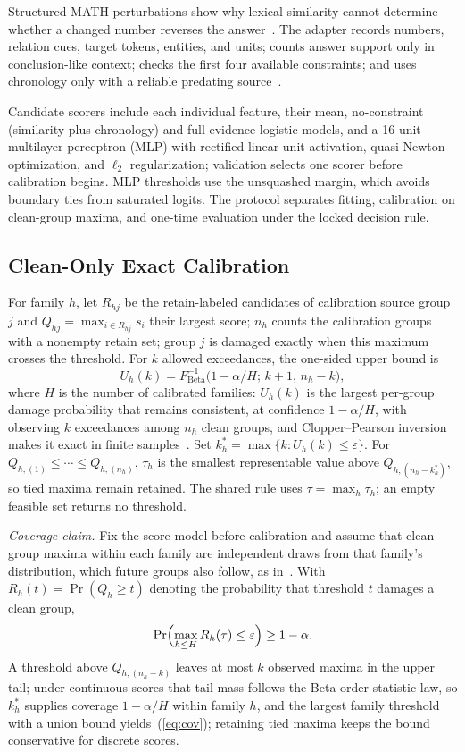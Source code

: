 \documentclass[conference]{IEEEtran}
\begin{document}
Structured MATH perturbations show why lexical similarity cannot determine whether a changed number reverses the answer~\cite{huang2025}. The adapter records numbers, relation cues, target tokens, entities, and units; counts answer support only in conclusion-like context; checks the first four available constraints; and uses chronology only with a reliable predating source~\cite{miao2020}.

Candidate scorers include each individual feature, their mean, no-constraint (similarity-plus-chronology) and full-evidence logistic models, and a 16-unit multilayer perceptron (MLP) with rectified-linear-unit activation, quasi-Newton optimization, and $\ell_2$ regularization; validation selects one scorer before calibration begins. MLP thresholds use the unsquashed margin, which avoids boundary ties from saturated logits. The protocol separates fitting, calibration on clean-group maxima, and one-time evaluation under the locked decision rule.

\subsection{Clean-Only Exact Calibration}
For family $h$, let $R_{hj}$ be the retain-labeled candidates of calibration source group $j$ and $Q_{hj}=\max_{i\in R_{hj}} s_i$ their largest score; $n_h$ counts the calibration groups with a nonempty retain set; group $j$ is damaged exactly when this maximum crosses the threshold. For $k$ allowed exceedances, the one-sided upper bound is
\begin{equation}
U_h(k)=F^{-1}_{\mathrm{Beta}}\bigl(1-\alpha/H;\,k+1,\,n_h-k\bigr),
\label{eq:cp}
\end{equation}
where $H$ is the number of calibrated families: $U_h(k)$ is the largest per-group damage probability that remains consistent, at confidence $1-\alpha/H$, with observing $k$ exceedances among $n_h$ clean groups, and Clopper--Pearson inversion makes it exact in finite samples~\cite{clopper1934}. Set $k_h^{*}=\max\{k: U_h(k)\le\varepsilon\}$. For $Q_{h,(1)}\le\cdots\le Q_{h,(n_h)}$, $\tau_h$ is the smallest representable value above $Q_{h,(n_h-k_h^{*})}$, so tied maxima remain retained. The shared rule uses $\tau=\max_h \tau_h$; an empty feasible set returns no threshold.

\textit{Coverage claim.} Fix the score model before calibration and assume that clean-group maxima  within each family are independent draws from that family's distribution, which future groups also follow, as in~\cite{bates2021}. With $R_h(t)=\Pr(Q_h\ge t)$ denoting the probability that threshold $t$ damages a clean group,
\begin{equation}
\Pr\Bigl(\max_{h\le H} R_h(\tau)\le\varepsilon\Bigr)\ge 1-\alpha.
\label{eq:cov}
\end{equation}
A threshold above $Q_{h,(n_h-k)}$ leaves at most $k$ observed maxima in the upper tail; under continuous scores that tail mass follows the Beta order-statistic law, so $k_h^{*}$ supplies coverage $1-\alpha/H$ within family $h$, and the largest family threshold with a union bound yields~(\ref{eq:cov}); retaining tied maxima keeps the bound conservative for discrete scores.
\end{document}
